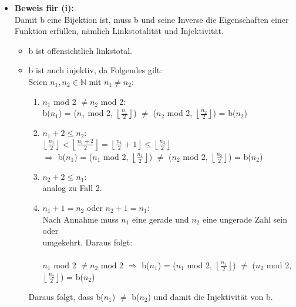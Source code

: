 \documentclass[a4paper,10pt]{article}
\newcommand{\rf}{\right\rfloor}
\newcommand{\lf}{\left\lfloor}
\newcommand{\N}{\mathbb{N}}
\begin{document}
\begin{itemize}
\item 	\textbf{Beweis für (i):} \\
	Damit b eine Bijektion ist, muss b und seine Inverse die Eigenschaften einer Funktion erfüllen, nämlich Linkstotalität und Injektivität. 
	\begin{itemize}
	 	\item b ist offensichtlich linkstotal.
	 	\item b ist auch injektiv, da Folgendes gilt: \\
			Seien $n_1,n_2 \in \N$ mit $n_1 \neq n_2$: 
			\begin{enumerate}
			 	\setlength{\itemindent}{1em}
				\item 	$n_1$ mod 2 $\neq n_2$ mod 2: \\
					b($n_1$) = ($n_1$ mod 2, $\lf \frac{n_1}{2} \rf$) $\neq$ ($n_2$ mod 2, $\lf \frac{n_2}{2} \rf$) = b($n_2$)\\
				\item  	$n_1 + 2 \leq n_2$: \\
					$\lf \frac{n_1}{2} \rf < \lf \frac{n_1 + 2}{2} \rf = \lf \frac{n_1}{2} + 1 \rf \leq \lf \frac{n_2}{2} \rf$ \\  
					$\Rightarrow$ b($n_1$) = ($n_1$ mod 2, $\lf \frac{n_1}{2} \rf$) $\neq$ ($n_2$ mod 2, $\lf \frac{n_2}{2} \rf$) = b($n_2$) 
				\item  	$n_2 + 2 \leq n_1$: \\
					analog zu Fall 2. 
				\item  	$n_1 + 1 = n_2$ oder $n_2 + 1 = n_1$: \\
					Nach Annahme muss $n_1$ eine gerade und $n_2$ eine ungerade Zahl sein oder \\
					umgekehrt. Daraus folgt:\\
					\\
					$n_1$ mod 2 $\neq n_2$ mod 2 $\Rightarrow$ 
					b($n_1$) = ($n_1$ mod 2, $\lf \frac{n_1}{2} \rf$) $\neq$ ($n_2$ mod 2, $\lf \frac{n_2}{2} \rf$) = b($n_2$)
			\end{enumerate}
	Daraus folgt, dass b($n_1$) $\neq$ b($n_2$) und damit die Injektivität von b.

	\end{itemize}


\end{itemize}
\end{document}
